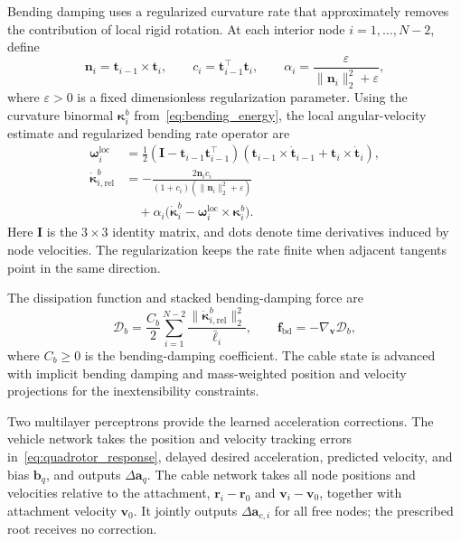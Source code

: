 Bending damping uses a regularized curvature rate that
approximately removes the contribution of local rigid rotation.
At each interior node $i=1,\ldots,N-2$, define
\[
\mathbf n_i=\mathbf t_{i-1}\times\mathbf t_i,
\qquad
c_i=\mathbf t_{i-1}^\top\mathbf t_i,
\qquad
\alpha_i=
\frac{\varepsilon}{\|\mathbf n_i\|_2^2+\varepsilon},
\]
where $\varepsilon>0$ is a fixed dimensionless regularization
parameter.
Using the curvature binormal
$\boldsymbol\kappa_i^b$ from~\eqref{eq:bending_energy},
the local angular-velocity estimate and regularized bending
rate operator are
\begin{equation}
\begin{aligned}
\boldsymbol\omega_i^{\mathrm{loc}}
&=\tfrac12(\mathbf I-\mathbf t_{i-1}\mathbf t_{i-1}^\top)
(\mathbf t_{i-1}\times\dot{\mathbf t}_{i-1}
+\mathbf t_i\times\dot{\mathbf t}_i),\\
\dot{\boldsymbol\kappa}_{i,\mathrm{rel}}^b
&=-\frac{2\mathbf n_i\dot c_i}
{(1+c_i)(\|\mathbf n_i\|_2^2+\varepsilon)}\\
&\quad+\alpha_i\bigl(\dot{\boldsymbol\kappa}_i^b
-\boldsymbol\omega_i^{\mathrm{loc}}\times\boldsymbol\kappa_i^b\bigr).
\end{aligned}
\label{eq:regularized_bending_rate}
\end{equation}
Here $\mathbf I$ is the $3\times3$ identity matrix, and dots
denote time derivatives induced by node velocities.
The regularization keeps the rate finite when adjacent tangents
point in the same direction.

The dissipation function and stacked bending-damping force are
\begin{equation}
\mathcal D_b=\frac{C_b}{2}
\sum_{i=1}^{N-2}\frac{\|\dot{\boldsymbol\kappa}_{i,\mathrm{rel}}^b\|_2^2}{\bar\ell_i},
\qquad
\mathbf f_{\mathrm{bd}}=-\nabla_{\mathbf v}\mathcal D_b,
\label{eq:bending_damping}
\end{equation}
where $C_b\geq0$ is the bending-damping coefficient.
The cable state is advanced with implicit bending damping and
mass-weighted position and velocity projections for the
inextensibility constraints.

Two multilayer perceptrons provide the learned acceleration
corrections. The vehicle network takes the position and velocity
tracking errors in~\eqref{eq:quadrotor_response}, delayed desired
acceleration, predicted velocity, and bias $\mathbf b_q$,
and outputs $\Delta\mathbf a_q$.
The cable network takes all node positions and velocities
relative to the attachment,
$\mathbf r_i-\mathbf r_0$ and $\mathbf v_i-\mathbf v_0$,
together with attachment velocity $\mathbf v_0$.
It jointly outputs $\Delta\mathbf a_{c,i}$ for all free nodes;
the prescribed root receives no correction.

